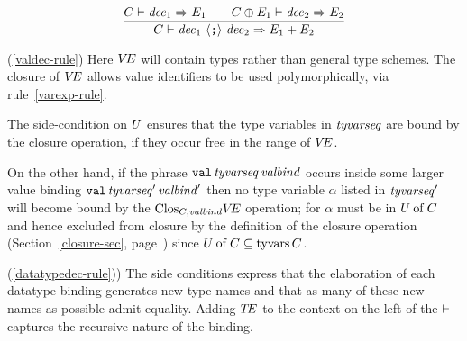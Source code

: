 \begin{equation}        %
\frac{\C\ts\dec_1\ra\E_1\qquad\C\oplus\E_1\ts\dec_2\ra\E_2}
     {\C\ts\seqdec\ra\plusmap{E_1}{E_2}}
\end{equation}
\comments
\begin{description}

\item{(\ref{valdec-rule})}
Here $\mbox{$V\!E$}$ will contain types rather than general
type schemes.
The closure of $\mbox{$V\!E$}$
allows value identifiers  to
be used polymorphically, via rule~\ref{varexp-rule}.

The side-condition on $U$
ensures that the type variables in ${\it tyvarseq}$  are bound
by the closure operation,
if they occur free in the range of $\mbox{$V\!E$}$.

On the other hand,
if the phrase $\hbox{\tt val}\,{\it tyvarseq}\,{\it valbind}$ occurs inside
some larger value binding $\hbox{\tt val}\,{\it tyvarseq}'\,{\it valbind}'$
then no type variable $\alpha$ listed in ${\it tyvarseq}'$ will become
bound by the ${\rm Clos}_{C,{\it valbind}}\mbox{$V\!E$}$ operation; for $\alpha$ must
be in $U \mathbin{\rm of} C$ and hence excluded from closure by the definition of the closure operation
(Section~\ref{closure-sec}, page~\pageref{clos-def-lab})
since $U \mathbin{\rm of} C\subseteq\mathop{\rm tyvars}\nolimits C$.

\begin{center}
\end{center}%

\item{(\ref{datatypedec-rule})\CUT{,(\ref{abstypedec-rule}})}
The side conditions
express that the elaboration of each datatype binding
generates new type names and that as many of these new names
as possible admit equality.  Adding $\mbox{$T\!E$}$ to the context on the left
of the $\vdash$ captures the recursive nature of the binding.


\end{description}
